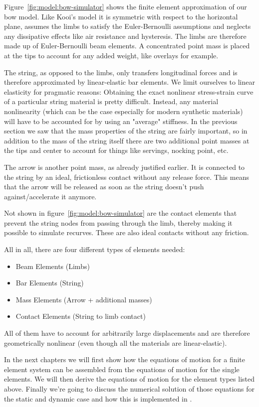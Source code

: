 Figure~\ref{fig:model:bow-simulator} shows the finite element approximation of our bow model. Like Kooi's model it is symmetric with respect to the horizontal plane, assumes the limbs to satisfy the Euler-Bernoulli assumptions and neglects any dissipative effects like air resistance and hysteresis. The limbs are therefore made up of Euler-Bernoulli beam elements. A concentrated point mass is placed at the tips to account for any added weight, like overlays for example.

The string, as opposed to the limbs, only transfers longitudinal forces and is therefore approximated by linear-elastic bar elements. We limit ourselves to linear elasticity for pragmatic reasons: Obtaining the exact nonlinear stress-strain curve of a particular string material is pretty difficult. Instead, any material nonlinearity (which can be the case especially for modern synthetic materials) will have to be accounted for by using an "average" stiffness. In the previous section we saw that the mass properties of the string are fairly important, so in addition to the mass of the string itself there are two additional point masses at the tips and center to account for things like servings, nocking point, etc.

The arrow is another point mass, as already justified earlier. It is connected to the string by an ideal, frictionless contact without any release force. This means that the arrow will be released as soon as the string doesn't push against/accelerate it anymore.

Not shown in figure~\ref{fig:model:bow-simulator} are the contact elements that prevent the string nodes from passing through the limb, thereby making it possible to simulate recurves. These are also ideal contacts without any friction.

All in all, there are four different types of elements needed:

\begin{itemize}
\item Beam Elements (Limbs)
\item Bar Elements (String)
\item Mass Elements (Arrow + additional masses)
\item Contact Elements (String to limb contact)
\end{itemize}

All of them have to account for arbitrarily large displacements and are therefore geometrically nonlinear (even though all the materials are linear-elastic).

In the next chapters we will first show how the equations of motion for a finite element system can be assembled from the equations of motion for the single elements. We will then derive the equations of motion for the element types listed above. Finally we're going to discuss the numerical solution of those equations for the static and dynamic case and how this is implemented in \swtitle.